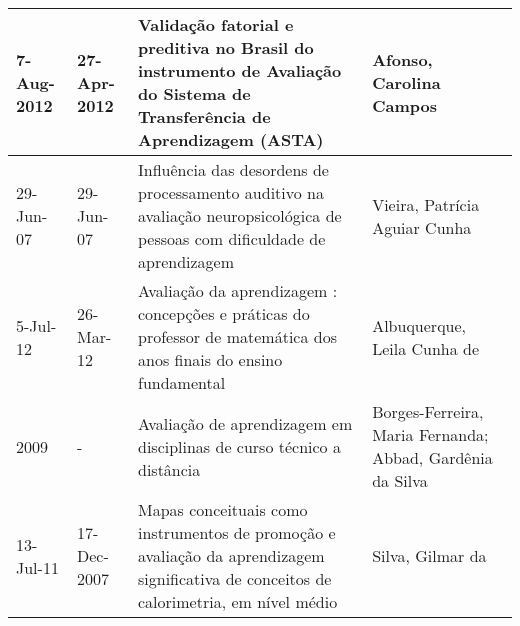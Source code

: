 \begin{table}
{\begin{tabular}{|m{1.3cm}|m{1.3cm}|p{7cm}|p{6cm}|}
7-Aug-2012  & 27-Apr-2012 & Validação fatorial e preditiva no Brasil do instrumento de Avaliação do Sistema de Transferência de Aprendizagem (ASTA)                                                                                               & Afonso, Carolina Campos                                                                                                                                                                                                                                      \\ \hline
29-Jun-07   & 29-Jun-07   & Influência das desordens de processamento auditivo na avaliação neuropsicológica de pessoas com dificuldade de aprendizagem                                                                                           & Vieira, Patrícia Aguiar Cunha                                                                                                                                                                                                                                \\ \hline
5-Jul-12    & 26-Mar-12   & Avaliação da aprendizagem : concepções e práticas do professor de matemática dos anos finais do ensino fundamental                                                                                                    & Albuquerque, Leila Cunha de                                                                                                                                                                                                                                  \\ \hline
2009        & -           & Avaliação de aprendizagem em disciplinas de curso técnico a distância                                                                                                                                                 & Borges-Ferreira, Maria Fernanda; Abbad, Gardênia da Silva                                                                                                                                                                                                    \\ \hline
13-Jul-11   & 17-Dec-2007 & Mapas conceituais como instrumentos de promoção e avaliação da aprendizagem significativa de conceitos de calorimetria, em nível médio                                                                                & Silva, Gilmar da                                                                                                                                                                                                                                             \\ \hline

\end{tabular}}
\end{table}
